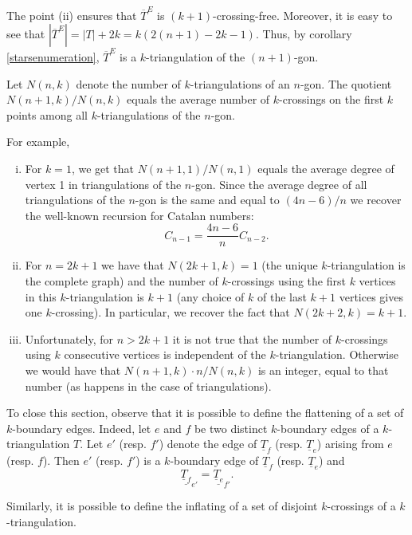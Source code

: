 \documentclass[12pt]{amsart}
\begin{document}
The point (ii) ensures that $\overline{T}^E$ is $(k+1)$-crossing-free. Moreover, it is easy to see that $|\overline{T}^E|=|T|+2k=k(2(n+1)-2k-1)$. Thus, by corollary \ref{starsenumeration}, $\overline{T}^E$ is a $k$-triangulation of the $(n+1)$-gon.

\begin{corollary}
Let $N(n,k)$ denote the number of $k$-triangulations of an $n$-gon. The quotient $N(n+1,k)/N(n,k)$ equals the average number of $k$-crossings on the first $k$ points among all $k$-triangulations of the $n$-gon.
\end{corollary}

For example,
\begin{enumerate}[(i)]
\item For $k=1$, we get that $N(n+1,1)/N(n,1)$ equals the average degree of vertex 1 in triangulations of the $n$-gon. Since the average degree of all triangulations of the $n$-gon is the same and equal to $(4n-6)/n$ we recover the well-known recursion for Catalan numbers:
\[
C_{n-1}=\frac{4n-6}{n}C_{n-2}.
\]

\item For $n=2k+1$ we have that $N(2k+1,k)=1$ (the unique $k$-triangulation is the complete graph)
and the number of $k$-crossings using the first $k$ vertices in this $k$-triangulation is $k+1$ (any choice of $k$ of the last $k+1$ vertices gives one $k$-crossing). In particular, we recover the fact that $N(2k+2,k)=k+1$.

\item Unfortunately, for $n>2k+1$ it is not true that the number of $k$-crossings using $k$ consecutive vertices is independent of the $k$-triangulation. Otherwise we would have that  $N(n+1,k)\cdot n /N(n,k)$ is an integer, equal to that number (as happens in the case of triangulations).
\end{enumerate}

\medskip
To close this section, observe that it is possible to define the flattening of a set of $k$-boundary edges. Indeed, let $e$ and $f$ be two distinct $k$-boundary edges of a $k$-triangulation $T$. Let $e'$ (resp. $f'$) denote the edge of $\underline{T}_f$ (resp. $\underline{T}_e$) arising from $e$ (resp. $f$). Then $e'$ (resp. $f'$) is a $k$-boundary edge of $\underline{T}_f$ (resp. $\underline{T}_e$) and
$$\underline{\underline{T}_f}_{e'}=\underline{\underline{T}_e}_{f'}.$$

Similarly, it is possible to define the inflating of a set of disjoint $k$-crossings of a $k$-triangulation.
\end{document}
